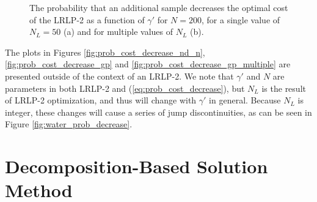 \documentclass[11pt]{article}
\begin{document}
\begin{figure}
	\centering
	\caption{The probability that an additional sample decreases the optimal cost of the LRLP-2 as a function of $\gamma'$ for $N = 200$, for a single value of $N_L = 50$ (a) and for multiple values of $N_L$ (b).}
\end{figure}

The plots in Figures \ref{fig:prob_cost_decrease_nd_n}, \ref{fig:prob_cost_decrease_gp} and \ref{fig:prob_cost_decrease_gp_multiple} are presented outside of the context of an LRLP-2.  We note that $\gamma'$ and $N$ are parameters in both LRLP-2 and (\ref{eq:prob_cost_decrease}), but $N_L$ is the result of LRLP-2 optimization, and thus will change with $\gamma'$ in general.  Because $N_L$ is integer, these changes will cause a series of jump discontinuities, as can be seen in Figure \ref{fig:water_prob_decrease}.

\section{Decomposition-Based Solution Method} \label{sec:soln_algorithm}
\end{document}
